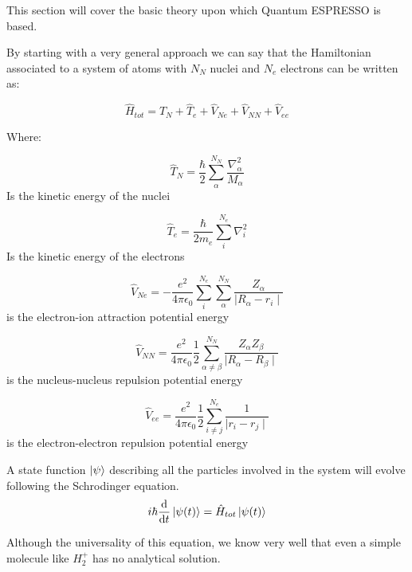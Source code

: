 \documentclass[a4paper,12pt]{article}
\begin{document}
This section will cover the basic theory upon which Quantum ESPRESSO is based.

By starting with a very general approach we can say that the Hamiltonian associated to a system of atoms with $N_N$ nuclei and $N_e$ electrons can be written as:


\begin{equation}\label{eq_theHamiltonian}
\hat{H}_{tot} = \hat{T}_{N} + \hat{T}_{e} + \hat{V}_{Ne} + \hat{V}_{NN} + \hat{V}_{ee}
\end{equation}

Where:

\begin{equation}
\hat{T}_{N} = \frac{\hbar}{2} \sum_{\alpha}^{N_N} \frac{\nabla_{\alpha}^2}{M_{\alpha}}
\end{equation}
Is the kinetic energy of the nuclei

\begin{equation}
\hat{T}_{e} = \frac{\hbar}{2m_{e}} \sum_{i}^{N_e} \nabla_{i}^2
\end{equation}
Is the kinetic energy of the electrons

\begin{equation}
\hat{V}_{Ne} = -\frac{e^2}{4\pi\epsilon_{0}} \sum_{i}^{N_e}\sum_{\alpha}^{N_N} \frac{Z_{\alpha}}{\mid R_{\alpha} - r_{i} \mid }
\end{equation}
is the electron-ion attraction potential energy

\begin{equation}
\hat{V}_{NN} = \frac{e^2}{4\pi\epsilon_{0}} \frac{1}{2} \sum_{\alpha \neq \beta}^{N_N} \frac{Z_{\alpha} Z_{\beta}}{\mid R_{\alpha} - R_{\beta} \mid }
\end{equation}
is the nucleus-nucleus repulsion potential energy

\begin{equation}
\hat{V}_{ee} = \frac{e^2}{4\pi\epsilon_{0}} \frac{1}{2} \sum_{i \neq j}^{N_e} \frac{1}{\mid r_{i} - r_{j} \mid }
\end{equation}
is the electron-electron repulsion potential energy

A state function $\ket{\psi}$ describing all the particles involved in the system will evolve following the Schrodinger equation.
\begin{equation}\label{eq:eq_sch}
	i\hbar\dv{t}\ket{\psi(t)} = \hat{H}_{tot}\ket{\psi(t)}
\end{equation}

Although the universality of this equation, we know very well that even a simple molecule like $H_2^{+}$ has no analytical solution.
\end{document}
